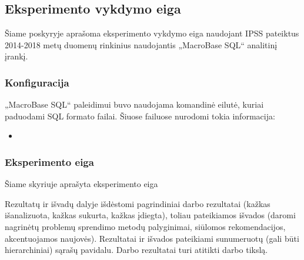 \documentclass{VUMIFPSbakalaurinis}
\begin{document}
\subsection{Eksperimento vykdymo eiga}
Šiame poskyryje aprašoma eksperimento vykdymo eiga naudojant IPSS pateiktus 2014-2018 metų duomenų rinkinius naudojantis „MacroBase SQL“ analitinį įrankį.

\subsubsection{Konfiguracija}
„MacroBase SQL“ paleidimui buvo naudojama komandinė eilutė, kuriai paduodami SQL formato failai. Šiuose failuose nurodomi tokia informacija:
\begin{itemize}
	\item 
\end{itemize}

\subsubsection{Eksperimento eiga}
Šiame skyriuje aprašyta eksperimento eiga 








Rezultatų ir išvadų dalyje išdėstomi pagrindiniai darbo rezultatai (kažkas
išanalizuota, kažkas sukurta, kažkas įdiegta), toliau pateikiamos išvados
(daromi nagrinėtų problemų sprendimo metodų palyginimai, siūlomos
rekomendacijos, akcentuojamos naujovės). Rezultatai ir išvados pateikiami
sunumeruotų (gali būti hierarchiniai) sąrašų pavidalu. Darbo rezultatai turi
atitikti darbo tikslą.

\printbibliography[heading=bibintoc]  %
\end{document}
